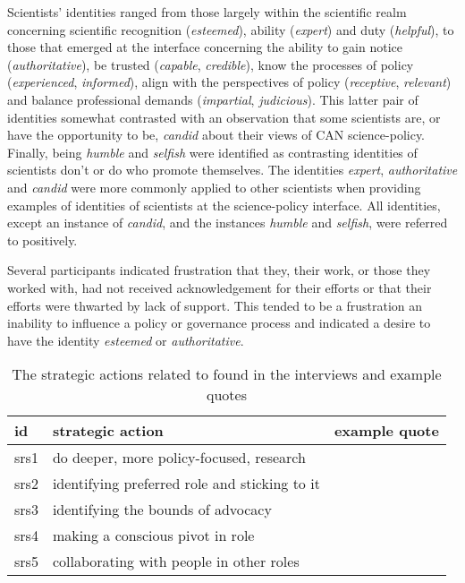 Scientists' identities ranged from those largely within the scientific realm concerning scientific recognition (\emph{esteemed}), ability (\emph{expert}) and duty (\emph{helpful}), to those that emerged at the interface concerning the ability to gain notice (\emph{authoritative}), be trusted (\emph{capable}, \emph{credible}), know the processes of policy (\emph{experienced}, \emph{informed}), align with the perspectives of policy (\emph{receptive}, \emph{relevant}) and balance professional demands (\emph{impartial}, \emph{judicious}). This latter pair of identities somewhat contrasted with an observation that some scientists are, or have the opportunity to be, \emph{candid} about their views of CAN science-policy. Finally, being \emph{humble} and \emph{selfish} were identified as contrasting identities of scientists don't or do who promote themselves. The identities \emph{expert}, \emph{authoritative} and \emph{candid} were more commonly applied to other scientists when providing examples of identities of scientists at the science-policy interface. All identities, except an instance of \emph{candid}, and the instances \emph{humble} and \emph{selfish}, were referred to positively.

Several participants indicated frustration that they, their work, or those they worked with, had not received acknowledgement for their efforts or that their efforts were thwarted by lack of support. This tended to be a frustration an inability to influence a policy or governance process and indicated a desire to have the identity \emph{esteemed} or \emph{authoritative}.

\begin{table}[!ht]
\footnotesize
\caption{The strategic actions related to \ismsr{} found in the interviews and example quotes}\label{tab:resrolesstrat}
\begin{tabular}{L{.06\linewidth}L{.3\linewidth}L{.64\linewidth}} \hline
\textbf{id} & \textbf{strategic action} & \textbf{example quote} \\ \hline \hline
srs1 & do deeper, more policy-focused, research &  \\[5mm]
srs2 & identifying preferred role and sticking to it &  \\[5mm]
srs3 & identifying the bounds of advocacy &  \\[5mm]
srs4 & making a conscious pivot in role &  \\[5mm]
srs5 & collaborating with people in other roles & \\[5mm] \hline
\end{tabular}
\end{table}

